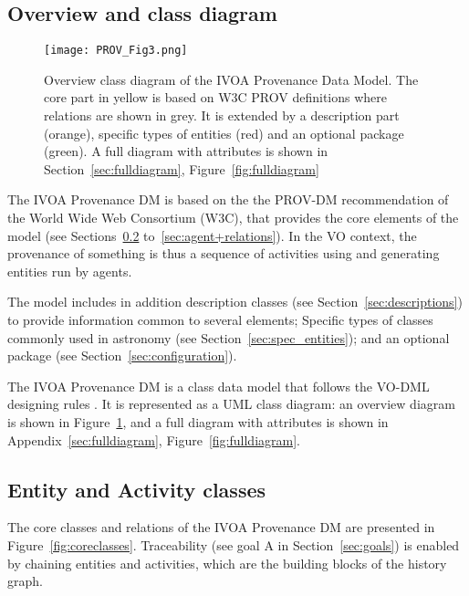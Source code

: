 

\subsection{Overview and class diagram}
\label{sec:overview}


\begin{figure}[hbt]
\centering
\texttt{[image: PROV\_Fig3.png]}
\caption[Overview class diagram of the IVOA Provenance Data Model]{Overview class diagram of the IVOA Provenance Data Model. The core part in yellow is based on W3C PROV definitions where relations are shown in grey. It is extended by a description part (orange), specific types of entities (red) and an optional  package (green). A full diagram with attributes is shown in Section~\ref{sec:fulldiagram}, Figure~\ref{fig:fulldiagram}}
\label{fig:overview}
\end{figure}

The IVOA Provenance DM is based on the the PROV-DM recommendation \citep{std:W3CProvDM} of the World Wide Web Consortium (W3C), that provides the core elements of the model (see Sections~\ref{sec:ent_act} to~\ref{sec:agent+relations}). 
In the VO context, the provenance of something is thus a sequence of activities using and generating entities run by agents.

The model includes in addition description classes (see Section~\ref{sec:descriptions}) to provide information common to several elements; Specific types of  classes commonly used in astronomy (see Section~\ref{sec:spec_entities}); and an optional  package (see Section~\ref{sec:configuration}).

The IVOA Provenance DM is a class data model that follows the VO-DML designing rules \citep{2018ivoa.spec.0910L}. It is represented as a UML class diagram: an overview diagram is shown in Figure~\ref{fig:overview}, and a full diagram with attributes is shown in Appendix~\ref{sec:fulldiagram}, Figure~\ref{fig:fulldiagram}.


\subsection{Entity and Activity classes}
\label{sec:ent_act}

The core classes and relations of the IVOA Provenance DM are presented in Figure~\ref{fig:coreclasses}.
Traceability (see goal A in Section~\ref{sec:goals}) is enabled by chaining entities and activities, which are the building blocks of the history graph.


